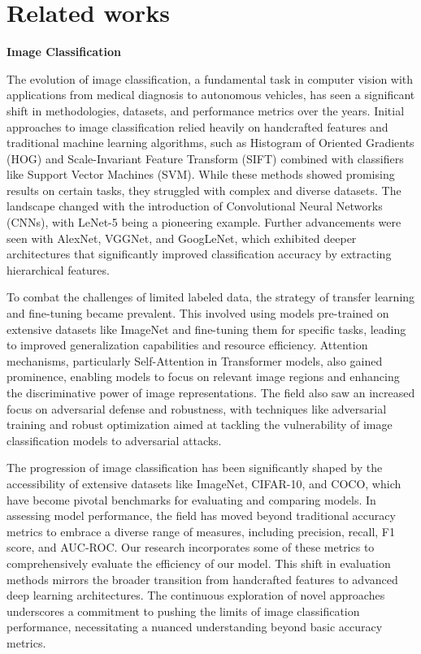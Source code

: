 \documentclass[nonacm, sigconf]{acmart}
\begin{document}
\section{Related works}
\noindent\textbf{Image Classification}

\noindent
The evolution of image classification, a fundamental task in computer vision with applications from medical diagnosis to autonomous vehicles\cite{23}, has seen a significant shift in methodologies, datasets, and performance metrics over the years. Initial approaches to image classification relied heavily on handcrafted features and traditional machine learning algorithms, such as Histogram of Oriented Gradients (HOG)\cite{5} and Scale-Invariant Feature Transform (SIFT) combined with classifiers like Support Vector Machines (SVM). While these methods showed promising results on certain tasks, they struggled with complex and diverse datasets. The landscape changed with the introduction of Convolutional Neural Networks (CNNs), with LeNet-5 being a pioneering example. Further advancements were seen with AlexNet\cite{7}, VGGNet\cite{8}, and GoogLeNet\cite{9}, which exhibited deeper architectures that significantly improved classification accuracy by extracting hierarchical features.

\noindent 
To combat the challenges of limited labeled data, the strategy of transfer learning and fine-tuning became prevalent. This involved using models pre-trained on extensive datasets like ImageNet\cite{15} and fine-tuning them for specific tasks, leading to improved generalization capabilities and resource efficiency\cite{24}. Attention mechanisms, particularly Self-Attention in Transformer models\cite{12}, also gained prominence, enabling models to focus on relevant image regions and enhancing the discriminative power of image representations. The field also saw an increased focus on adversarial defense and robustness, with techniques like adversarial training\cite{25} and robust optimization aimed at tackling the vulnerability of image classification models to adversarial attacks.

\noindent 
The progression of image classification has been significantly shaped by the accessibility of extensive datasets like ImageNet, CIFAR-10, and COCO, which have become pivotal benchmarks for evaluating and comparing models. In assessing model performance, the field has moved beyond traditional accuracy metrics to embrace a diverse range of measures, including precision, recall, F1 score, and AUC-ROC. Our research incorporates some of these metrics to comprehensively evaluate the efficiency of our model. This shift in evaluation methods mirrors the broader transition from handcrafted features to advanced deep learning architectures. The continuous exploration of novel approaches underscores a commitment to pushing the limits of image classification performance, necessitating a nuanced understanding beyond basic accuracy metrics.
\end{document}
